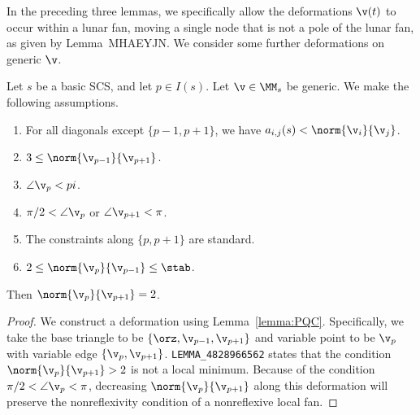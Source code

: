 In the preceding three lemmas, we specifically allow the deformations
$\v(t)$ to occur within a lunar fan, moving a single node that is not a pole
of the lunar fan, as given by Lemma~MHAEYJN.
We consider some further deformations on generic $\v$.



\begin{lemma}[482]\label{lemma:482-obtuse}
Let $s$ be a basic SCS, and let $p\in I(s)$.  Let $\v\in \MM_s$ be generic.
We make the following assumptions.
\begin{enumerate}
\item For all diagonals except $\{p-1,p+1\}$,
we have $a_{i,j}(s)<\norm{\v_i}{\v_j}$. 
\item  $3 \le \norm{\v_{p-1}}{\v_{p+1}}$. 
\item  $\angle\v_p < pi$. 
\item  $\pi/2 < \angle \v_p$ or $\angle \v_{p+1} < \pi$. 
\item  The constraints along $\{p,p+1\}$ are standard.  
\item   $2\le \norm{\v_p}{\v_{p-1}}\le \stab$.
\end{enumerate}
Then $\norm{\v_p}{\v_{p+1}} = 2$.
\end{lemma}

\begin{proof}  We construct a deformation using Lemma~\ref{lemma:PQC}.  Specifically, we take the
base triangle to be $\{\orz,\v_{p-1},\v_{p+1}\}$ and variable point to be $\v_p$ with variable edge $\{\v_{p},\v_{p+1}\}$.
{\tt LEMMA\_4828966562} states that the condition $\norm{\v_p}{\v_{p+1}} > 2$ is not a local minimum.
Because of the condition  $\pi/2 < \angle \v_p < \pi$, decreasing $\norm{\v_p}{\v_{p+1}}$ along this
deformation will preserve the nonreflexivity condition of a nonreflexive local fan.
\end{proof}

